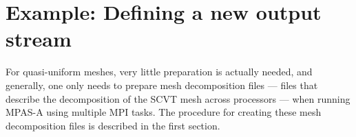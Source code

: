 \section{Example: Defining a new output stream}
\label{sec:stream_example} 

For quasi-uniform meshes, very little preparation is actually needed, and
generally, one only needs to prepare mesh decomposition files --- files that
describe the decomposition of the SCVT mesh across processors --- when running
MPAS-A using multiple MPI tasks. The procedure for creating these mesh
decomposition files is described in the first section. 
